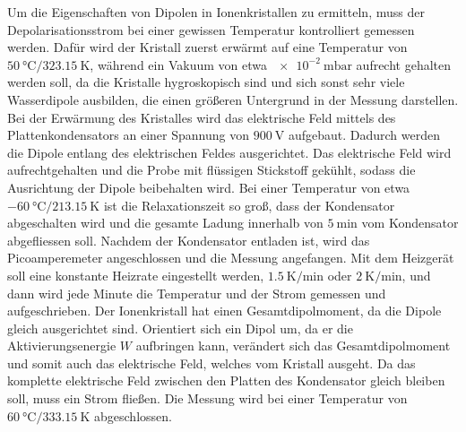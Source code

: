     \noindent Um die Eigenschaften von Dipolen in Ionenkristallen zu ermitteln, muss der Depolarisationsstrom bei einer gewissen Temperatur kontrolliert 
    gemessen werden. Dafür wird der Kristall zuerst erwärmt auf eine Temperatur von $\SI{50}{\celsius} / \SI{323.15}{\kelvin}$, während ein Vakuum von etwa $\SI{e-2}{\milli\bar}$ aufrecht gehalten werden soll, da 
    die Kristalle hygroskopisch sind und sich sonst sehr viele Wasserdipole ausbilden, die einen größeren Untergrund in der Messung darstellen. 
    Bei der Erwärmung des Kristalles wird das elektrische Feld mittels des Plattenkondensators an einer Spannung von $\SI{900}{\volt}$ aufgebaut. Dadurch werden die Dipole entlang des elektrischen 
    Feldes ausgerichtet. Das elektrische Feld wird aufrechtgehalten und die Probe mit flüssigen Stickstoff gekühlt, sodass die Ausrichtung der Dipole 
    beibehalten wird. Bei einer Temperatur von etwa $\SI{-60}{\celsius}/ \SI{213.15}{\kelvin}$ ist die Relaxationszeit so groß, dass der Kondensator abgeschalten wird 
    und die gesamte Ladung innerhalb von $\SI{5}{\minute}$ vom Kondensator abgefliessen soll. Nachdem der Kondensator entladen ist, wird das Picoamperemeter 
    angeschlossen und die Messung angefangen. Mit dem Heizgerät soll eine konstante Heizrate eingestellt werden, $\SI{1.5}{\kelvin\per\minute}$ oder $\SI{2}{\kelvin\per\minute}$, 
    und dann wird jede Minute die Temperatur und der Strom gemessen und aufgeschrieben. Der Ionenkristall hat einen Gesamtdipolmoment, da die Dipole 
    gleich ausgerichtet sind. Orientiert sich ein Dipol um, da er die Aktivierungsenergie $W$ aufbringen kann, verändert sich das Gesamtdipolmoment 
    und somit auch das elektrische Feld, welches vom Kristall ausgeht. Da das komplette elektrische Feld zwischen den Platten des Kondensator gleich bleiben soll, 
    muss ein Strom fließen. Die Messung wird bei einer Temperatur von $\SI{60}{\celsius}/ \SI{333.15}{\kelvin}$ 
    abgeschlossen. 

